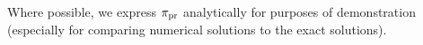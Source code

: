 %
%
%


Where possible, we express $\operatorname*{\pi_{pr}}$ analytically for purposes of demonstration (especially for comparing numerical solutions to the exact solutions).

